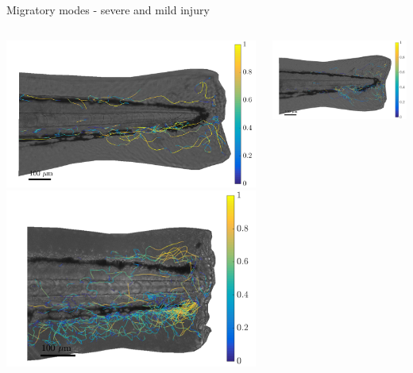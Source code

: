 \documentclass[mathserif,11pt]{beamer}
\begin{document}
\begin{frame}{Migratory modes - severe and mild injury}
\begin{columns}
	\begin{column}{0.31\textwidth}
		\vspace{-0.2cm}
		\includegraphics[scale=0.137]{Figures/mild1_mode1.png}\vfil
		\vspace{0.2cm}
		\includegraphics[scale=0.17]{Figures/severe1_mode1.png}
	\end{column}
	\begin{column}{0.31\textwidth}
		\vspace{-0.2cm}
		\includegraphics[scale=0.137]{Figures/mild1_mode2.png}\vfil

\end{column}
\end{columns}
\end{frame}
\end{document}
